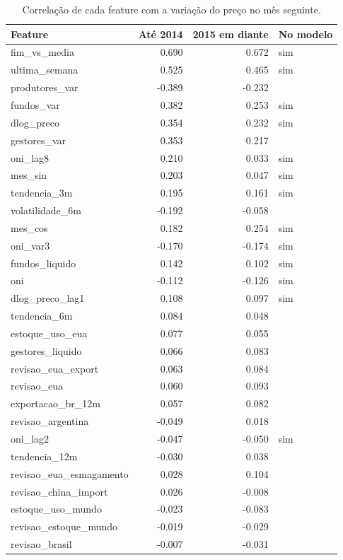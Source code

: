 \begin{table}
\caption{Correlação de cada feature com a variação do preço no mês seguinte.}
\label{tab:tab2_correlacao}
\begin{tabular}{lrrl}
\toprule
Feature & Até 2014 & 2015 em diante & No modelo \\
\midrule
fim\_vs\_media & 0.690 & 0.672 & sim \\
ultima\_semana & 0.525 & 0.465 & sim \\
produtores\_var & -0.389 & -0.232 &  \\
fundos\_var & 0.382 & 0.253 & sim \\
dlog\_preco & 0.354 & 0.232 & sim \\
gestores\_var & 0.353 & 0.217 &  \\
oni\_lag8 & 0.210 & 0.033 & sim \\
mes\_sin & 0.203 & 0.047 & sim \\
tendencia\_3m & 0.195 & 0.161 & sim \\
volatilidade\_6m & -0.192 & -0.058 &  \\
mes\_cos & 0.182 & 0.254 & sim \\
oni\_var3 & -0.170 & -0.174 & sim \\
fundos\_liquido & 0.142 & 0.102 & sim \\
oni & -0.112 & -0.126 & sim \\
dlog\_preco\_lag1 & 0.108 & 0.097 & sim \\
tendencia\_6m & 0.084 & 0.048 &  \\
estoque\_uso\_eua & 0.077 & 0.055 &  \\
gestores\_liquido & 0.066 & 0.083 &  \\
revisao\_eua\_export & 0.063 & 0.084 &  \\
revisao\_eua & 0.060 & 0.093 &  \\
exportacao\_br\_12m & 0.057 & 0.082 &  \\
revisao\_argentina & -0.049 & 0.018 &  \\
oni\_lag2 & -0.047 & -0.050 & sim \\
tendencia\_12m & -0.030 & 0.038 &  \\
revisao\_eua\_esmagamento & 0.028 & 0.104 &  \\
revisao\_china\_import & 0.026 & -0.008 &  \\
estoque\_uso\_mundo & -0.023 & -0.083 &  \\
revisao\_estoque\_mundo & -0.019 & -0.029 &  \\
revisao\_brasil & -0.007 & -0.031 &  \\
\bottomrule
\end{tabular}
\end{table}
